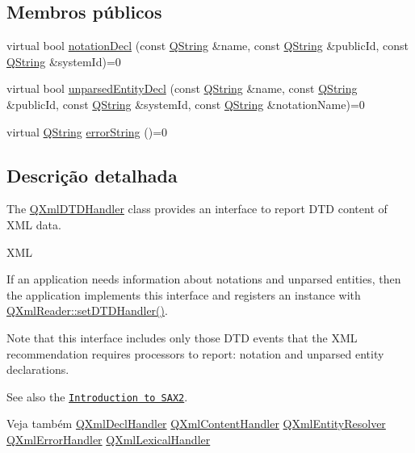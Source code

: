 \subsection*{Membros públicos}
\begin{DoxyCompactItemize}
\item 
virtual bool \hyperlink{class_q_xml_d_t_d_handler_adb6d2793e23cda467f599fea11bc0ddb}{notation\-Decl} (const \hyperlink{class_q_string}{Q\-String} \&name, const \hyperlink{class_q_string}{Q\-String} \&public\-Id, const \hyperlink{class_q_string}{Q\-String} \&system\-Id)=0
\item 
virtual bool \hyperlink{class_q_xml_d_t_d_handler_aa4afec8990cd2b491c904f109c2b3df1}{unparsed\-Entity\-Decl} (const \hyperlink{class_q_string}{Q\-String} \&name, const \hyperlink{class_q_string}{Q\-String} \&public\-Id, const \hyperlink{class_q_string}{Q\-String} \&system\-Id, const \hyperlink{class_q_string}{Q\-String} \&notation\-Name)=0
\item 
virtual \hyperlink{class_q_string}{Q\-String} \hyperlink{class_q_xml_d_t_d_handler_ac86bbbabef3a52aec7615cbbc0adb3f4}{error\-String} ()=0
\end{DoxyCompactItemize}


\subsection{Descrição detalhada}
The \hyperlink{class_q_xml_d_t_d_handler}{Q\-Xml\-D\-T\-D\-Handler} class provides an interface to report D\-T\-D content of X\-M\-L data. 

X\-M\-L

If an application needs information about notations and unparsed entities, then the application implements this interface and registers an instance with \hyperlink{class_q_xml_reader_a4bec7f4998841732d1d8d14a6fb123ec}{Q\-Xml\-Reader\-::set\-D\-T\-D\-Handler()}.

Note that this interface includes only those D\-T\-D events that the X\-M\-L recommendation requires processors to report\-: notation and unparsed entity declarations.

See also the \href{xml.html#introSAX2}{\tt Introduction to S\-A\-X2}.

\begin{DoxySeeAlso}{Veja também}
\hyperlink{class_q_xml_decl_handler}{Q\-Xml\-Decl\-Handler} \hyperlink{class_q_xml_content_handler}{Q\-Xml\-Content\-Handler} \hyperlink{class_q_xml_entity_resolver}{Q\-Xml\-Entity\-Resolver} \hyperlink{class_q_xml_error_handler}{Q\-Xml\-Error\-Handler} \hyperlink{class_q_xml_lexical_handler}{Q\-Xml\-Lexical\-Handler} 
\end{DoxySeeAlso}


